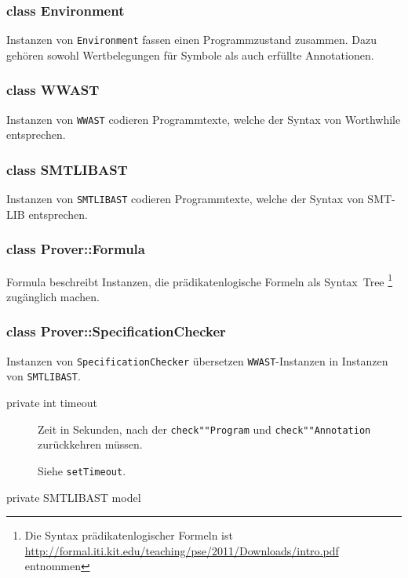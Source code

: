 \subsubsection{class Environment}%

Instanzen von \texttt{Environment} fassen einen Programmzustand
zusammen. Dazu gehören sowohl Wertbelegungen für Symbole als auch
erfüllte Annotationen.%

\subsubsection{class WWAST}%

Instanzen von \texttt{WWAST} codieren Programmtexte, welche der Syntax
von Worthwhile entsprechen.%

\subsubsection{class SMTLIBAST}%

Instanzen von \texttt{SMTLIBAST} codieren Programmtexte, welche der
Syntax von SMT-LIB entsprechen.%

\subsubsection{class Prover::Formula}%

Formula beschreibt Instanzen, die prädikatenlogische Formeln als
Syntax~Tree \footnote{Die Syntax prädikatenlogischer Formeln ist
\url{http://formal.iti.kit.edu/teaching/pse/2011/Downloads/intro.pdf}
entnommen} zugänglich machen.%

\subsubsection{class Prover::SpecificationChecker}%

Instanzen von \texttt{SpecificationChecker} übersetzen
\texttt{WWAST}-Instanzen in Instanzen von \texttt{SMTLIBAST}.%


\begin{description}%
    \item [private int timeout]

    Zeit in Sekunden, nach der \texttt{check""Program} und
    \texttt{check""Annotation} zurückkehren müssen.%

    Siehe \texttt{setTimeout}.%

    \item [private SMTLIBAST model]%

\end{description}%

